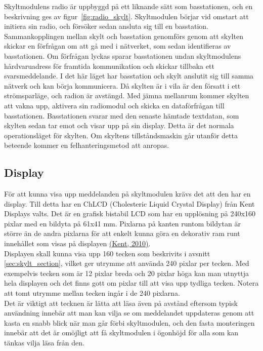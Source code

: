 \documentclass[a4paper,11pt]{article}
\begin{document}
Skyltmodulens radio är uppbyggd på ett liknande sätt som basstationen, och en beskrivning ges av figur~\ref{fig:radio_skylt}. Skyltmodulen börjar vid omstart att initiera sin radio, och försöker sedan ansluta sig till en basstation. Sammankopplingen mellan skylt och basstation genomförs genom att skylten skickar en förfrågan om att gå med i nätverket, som sedan identifieras av basstationen. Om förfrågan lyckas sparar basstationen undan skyltmodulens hårdvaruadress för framtida kommunikation och skickar tillbaka ett svarsmeddelande. I det här läget har basstation och skylt anslutit sig till samma nätverk och kan börja kommunicera. Då skylten är i vila är den försatt i ett strömsparläge, och radion är avstängd. Med jämna mellanrum kommer skylten att vakna upp, aktivera sin radiomodul och skicka en dataförfrågan till basstationen. Basstationen svarar med den senaste hämtade textdatan, som skylten sedan tar emot och visar upp på sin display. Detta är det normala operationsläget för skylten. Om skyltens tillståndsmaskin går utanför detta beteende kommer en felhanteringsmetod att anropas. 

\subsection{Display}
För att kunna visa upp meddelanden på skyltmodulen krävs det att den har en display. Till detta har en ChLCD (Cholesteric Liquid Crystal Display) från Kent Displays valts. Det är en grafisk bistabil LCD som har en upplösning på 240x160 pixlar med en bildyta på 61x41 mm. Pixlarna på kanten runtom bildytan är större än de andra pixlarna för att enkelt kunna göra en dekorativ ram runt innehållet som visas på displayen \hyperref[kent]{(Kent, 2010)}.\\

Displayen skall kunna visa upp 160 tecken som beskrivits i avsnitt \ref{sec:skylt_section}, vilket ger utrymme att använda 240 pixlar per tecken. Med exempelvis tecken som är 12 pixlar breda och 20 pixlar höga kan man utnyttja hela displayen och det finns gott om pixlar till att visa upp tydliga tecken. Notera att tomt utrymme mellan tecken ingår i de 240 pixlarna.\\

Det är viktigt att tecknen är lätta att läsa även på avstånd eftersom typisk användning innebär att man kan vilja se om meddelandet uppdateras genom att kasta en snabb blick när man går förbi skyltmodulen, och den fasta monteringen innebär att det är omöjligt att få skyltmodulen i ögonhöjd för alla som kan tänkas vilja läsa från den.
\end{document}
